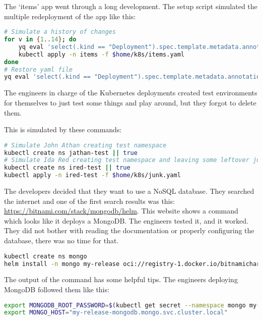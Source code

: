 The `items' app went through a long development. The setup script simulated the multiple redeployment of the app like this:

\begin{lstlisting}[caption={Create first deployment},language=bash,label=code:bash4]
# Simulate a history of changes
for v in {1..14}; do
    yq eval 'select(.kind == "Deployment").spec.template.metadata.annotations.v = env(v)' $home/k8s/items.yaml -i
    kubectl apply -n items -f $home/k8s/items.yaml
done
# Restore yaml file
yq eval 'select(.kind == "Deployment").spec.template.metadata.annotations.v = "0"' $home/k8s/items.yaml -i
\end{lstlisting}

The engineers in charge of the Kubernetes deployments created test environments for themselves to just test some things and play around, but they forgot to delete them.

This is simulated by these commands:

\begin{lstlisting}[caption={Create first deployment},language=bash,label=code:bash5]
# Simulate John Athan creating test namespace
kubectl create ns jathan-test || true
# Simulate Ida Red creating test namespace and leaving some leftover junk in it
kubectl create ns ired-test || true
kubectl apply -n ired-test -f $home/k8s/junk.yaml
\end{lstlisting}

The developers decided that they want to use a NoSQL database. They searched the internet and one of the first search results was this: \url{https://bitnami.com/stack/mongodb/helm}. This website shows a command which looks like it deploys a MongoDB. The engineers tested it, and it worked. They did not bother with reading the documentation or properly configuring the database, there was no time for that.

\begin{lstlisting}[caption={Create first deployment},language=bash,label=code:bash5]
kubectl create ns mongo
helm install -n mongo my-release oci://registry-1.docker.io/bitnamicharts/mongodb
\end{lstlisting}

The output of the command has some helpful tips. The engineers deploying MongoDB followed them like this:

\begin{lstlisting}[caption={Create first deployment},language=bash,label=code:bash6]
export MONGODB_ROOT_PASSWORD=$(kubectl get secret --namespace mongo my-release-mongodb -o jsonpath="{.data.mongodb-root-password}" | base64 -d)
export MONGO_HOST="my-release-mongodb.mongo.svc.cluster.local"
\end{lstlisting}

